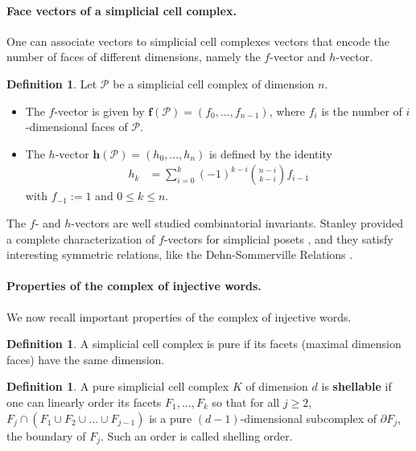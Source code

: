 \documentclass[a4paper,11pt]{article}
\theoremstyle{definition}
\newtheorem{definition}[theorem]{Definition}
\newcommand{\PP}{\mathcal{P}}
\begin{document}
\paragraph{Face vectors of a simplicial cell complex.} One can associate vectors to simplicial cell complexes vectors that encode the number of faces of different dimensions, namely the $f$-vector and $h$-vector. 
\begin{definition}
\label{dfn-f-h-vector}
	Let $\PP$ be a simplicial cell complex of dimension $n$. 
	\begin{itemize}
		\item The $f$-vector is given by $\textbf{f}(\PP) = (f_0, \ldots, f_{n-1})$, 
		where $f_i$ is  the number of $i$-dimensional faces of $\PP$. 
		
		\item The $h$-vector $\textbf{h}(\PP) = (h_0, \ldots, h_{n})$ is defined by the identity 
		\begin{align*}
			h_k &= \sum_{i=0}^{k} (-1)^{k-i} {n-i \choose k-i} f_{i-1} 
		\end{align*}
		with  $f_{-1} := 1$ and $0 \leq k \leq n$.
	\end{itemize}
\end{definition}

The $f$- and $h$-vectors are well studied combinatorial invariants. Stanley provided a complete characterization of $f$-vectors for simplicial posets \cite{STANLEY-fhvectors}, and they satisfy interesting symmetric relations, like the Dehn-Sommerville Relations \cite[Chapter~1.3]{buchstaber2014toric}.
    
\paragraph{Properties of the complex of injective words.} We now recall important properties of the complex of injective words. 

\begin{definition}
 	A simplicial cell complex is pure if its facets (maximal dimension faces) have the same dimension.
\end{definition}

\begin{definition} A pure simplicial cell complex $K$ of dimension $d$ is \textbf{shellable} if one can linearly order its facets $F_1, \ldots, F_k$ so that for all $j \geq 2$, $F_j \cap (F_1 \cup F_2 \cup \ldots \cup F_{j-1})$ is a pure $(d-1)$-dimensional subcomplex of $\partial F_j$, the boundary of $F_j$. Such an order is called shelling order.
 \end{definition} 
\end{document}
